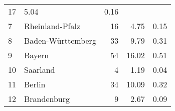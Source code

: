 \begin{longtable}{lXrrr}
       \num{17} &
       \num[round-mode=places,round-precision=2]{5.04} &
         \num[round-mode=places,round-precision=2]{0.16} \\

     7 &
     \multicolumn{1}{X}{ Rheinland-Pfalz   } &


       \num{16} &
       \num[round-mode=places,round-precision=2]{4.75} &
         \num[round-mode=places,round-precision=2]{0.15} \\

     8 &
     \multicolumn{1}{X}{ Baden-Württemberg   } &


       \num{33} &
       \num[round-mode=places,round-precision=2]{9.79} &
         \num[round-mode=places,round-precision=2]{0.31} \\

     9 &
     \multicolumn{1}{X}{ Bayern   } &


       \num{54} &
       \num[round-mode=places,round-precision=2]{16.02} &
         \num[round-mode=places,round-precision=2]{0.51} \\

     10 &
     \multicolumn{1}{X}{ Saarland   } &


       \num{4} &
       \num[round-mode=places,round-precision=2]{1.19} &
         \num[round-mode=places,round-precision=2]{0.04} \\

     11 &
     \multicolumn{1}{X}{ Berlin   } &


       \num{34} &
       \num[round-mode=places,round-precision=2]{10.09} &
         \num[round-mode=places,round-precision=2]{0.32} \\

     12 &
     \multicolumn{1}{X}{ Brandenburg   } &


       \num{9} &
       \num[round-mode=places,round-precision=2]{2.67} &
         \num[round-mode=places,round-precision=2]{0.09} \\


\end{longtable}
